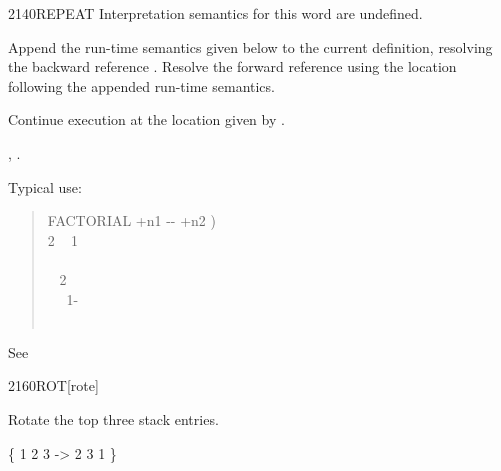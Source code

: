\begin{worddef}{2140}{REPEAT}
\interpret
	Interpretation semantics for this word are undefined.

\compile

	Append the run-time semantics given below to the current
	definition, resolving the backward reference .
	Resolve the forward reference  using the location
	following the appended run-time semantics.

\runtime
	\stack{}{}

	Continue execution at the location given by .

\see {},
	.

	\begin{defer}
	\rationale %
		Typical use:
		\begin{quote}\ttfamily
			\word{:} FACTORIAL  +n1 -{}- +n2 ) \\
			\tab {} 2  ~
				 1 ~  \\
			\tab {} \\
			\tab {}~  2   \\
			\tab~~ 1- ~  \word{*}~  \\
			\tab {}  \\
			\word{;}
		\end{quote}

	\testing*
		See 
	\end{defer}
\end{worddef}


\begin{worddef}{2160}{ROT}[rote]
\item {}

	Rotate the top three stack entries.

	\begin{defer}
	\testing
		\{ 1 2 3  -> 2 3 1 \}
	\end{defer}
\end{worddef}


